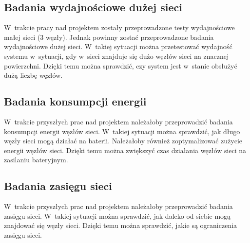 \subsection{Badania wydajnościowe dużej sieci}
W~trakcie pracy nad projektem zostały przeprowadzone testy wydajnościowe małej sieci (3 węzły).
Jednak powinny zostać przeprowadzone badania wydajnościowe dużej sieci.
W~takiej sytuacji można przetestować wydajność systemu w~sytuacji, gdy w~sieci znajduje się dużo węzłów sieci na znacznej powierzchni.
Dzięki temu można sprawdzić, czy system jest w~stanie obsłużyć dużą liczbę węzłów.

\subsection{Badania konsumpcji energii}
W~trakcie przyszłych prac nad projektem należałoby przeprowadzić badania konsumpcji energii węzłów sieci.
W~takiej sytuacji można sprawdzić, jak długo węzły sieci mogą działać na baterii.
Należałoby również zoptymalizować zużycie energii węzłów sieci.
Dzięki temu można zwiększyć czas działania węzłów sieci na zasilaniu bateryjnym.

\subsection{Badania zasięgu sieci}
W~trakcie przyszłych prac nad projektem należałoby przeprowadzić badania zasięgu sieci.
W~takiej sytuacji można sprawdzić, jak daleko od siebie mogą znajdować się węzły sieci.
Dzięki temu można sprawdzić, jakie są ograniczenia zasięgu sieci.

